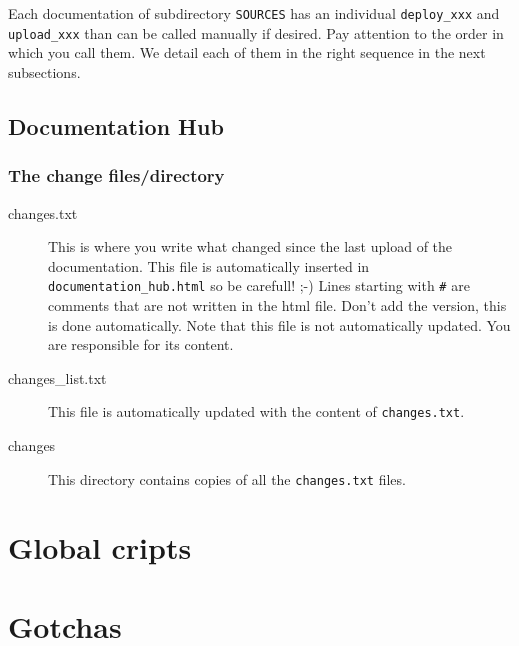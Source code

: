 \documentclass[a4paper,10pt]{article}
\begin{document}
Each documentation of subdirectory \verb+SOURCES+  has an individual \verb+deploy_xxx+ and \verb+upload_xxx+ than can be called manually if desired. Pay attention to the order in which you call them.
 We detail each of them in the right sequence in the next subsections.
\subsection{Documentation Hub}

\subsubsection{The change files/directory}

\begin{description}
 \item[changes.txt] This is where you write what changed since the last upload of the documentation. This file is automatically inserted in \verb+documentation_hub.html+ so be carefull! ;-) Lines starting with \verb+#+ are comments that are not written in the html file. Don't add the version, this is done automatically. Note that this file is not automatically updated. You are responsible for its content.
 \item[changes\_list.txt] This file is automatically updated with the content of \verb+changes.txt+.
 \item[changes] This directory contains copies of all the \verb+changes.txt+ files.
 \end{description}




\section{Global cripts}
\label{global_scripts}




\section{Gotchas}
\end{document}
